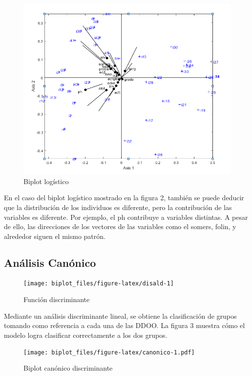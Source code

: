 \documentclass[
  10pt,
  spanish,
]{article}
\begin{document}
\begin{figure}

{\centering \includegraphics[width=0.75\linewidth]{LogBiplot} 

}

\caption{Biplot logístico}\label{fig:logbiplot}
\end{figure}

En el caso del biplot logístico mostrado en la figura 2, también se
puede deducir que la distribución de los individuos es diferente, pero
la contribución de las variables es diferente. Por ejemplo, el ph
contribuye a variables distintas. A pesar de ello, las direcciones de
los vectores de las variables como el somers, folin, y alrededor siguen
el mismo patrón.

\hypertarget{anuxe1lisis-canuxf3nico}{%
\subsection{Análisis Canónico}\label{anuxe1lisis-canuxf3nico}}

\begin{figure}

{\centering \texttt{[image: biplot\_files/figure-latex/disald-1]} 

}

\caption{Función discriminante}\label{fig:disald}
\end{figure}

Mediante un análisis discriminante lineal, se obtiene la clasificación
de grupos tomando como referencia a cada una de las DDOO. La figura 3
muestra cómo el modelo logra clasificar correctamente a los dos grupos.

\begin{figure}
\centering
\texttt{[image: biplot\_files/figure-latex/canonico-1.pdf]}
\caption{Biplot canónico discriminante}
\end{figure}
\end{document}
